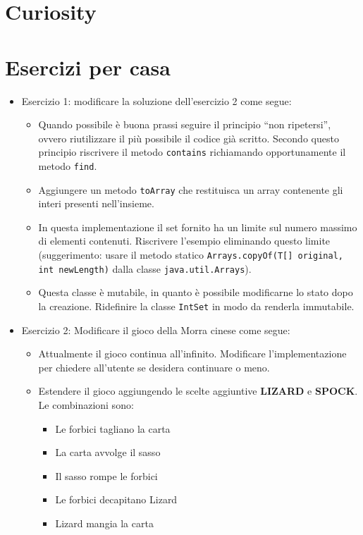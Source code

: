 \documentclass{article}
\begin{document}
\section{Curiosity}



\section{Esercizi per casa}
\begin{itemize}
\item Esercizio 1: modificare la soluzione dell'esercizio 2 come segue:
\begin{itemize}
	\item Quando possibile è buona prassi seguire il principio ``non ripetersi'', ovvero riutilizzare il più possibile il codice già scritto.
	Secondo questo principio riscrivere il metodo \texttt{contains}
	richiamando opportunamente il metodo \texttt{find}.
	\item Aggiungere un metodo \texttt{toArray} che restituisca un array contenente gli interi presenti nell'insieme.
	\item In questa implementazione il set fornito ha un limite
	sul numero massimo di elementi contenuti.
	Riscrivere l'esempio eliminando questo limite (suggerimento:
	usare il metodo statico \texttt{Arrays.copyOf(T[] original, int newLength)} dalla classe \texttt{java.util.Arrays}).
	\item Questa classe è mutabile, in quanto è possibile modificarne lo stato dopo la creazione. Ridefinire la classe \texttt{IntSet}
	in modo da renderla immutabile.	
\end{itemize}
\item Esercizio 2: Modificare il gioco della Morra cinese come segue:
\begin{itemize}
	\item Attualmente il gioco continua all'infinito. Modificare l'implementazione per chiedere all'utente se desidera continuare o meno.
	\item Estendere il gioco aggiungendo le scelte aggiuntive \textbf{LIZARD} e \textbf{SPOCK}. Le combinazioni sono:
	\begin{itemize}
			\item Le forbici tagliano la carta
			\item La carta avvolge il sasso
			\item Il sasso rompe le forbici
			\item Le forbici decapitano Lizard
			\item Lizard mangia la carta

\end{itemize}
\end{itemize}
\end{itemize}
\end{document}
